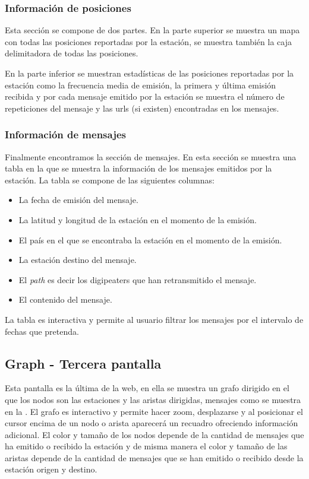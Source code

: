 \subsubsection*{Información de posiciones}
Esta sección se compone de dos partes. En la parte superior se muestra un mapa con todas las posiciones reportadas por la estación, se muestra también la caja delimitadora de todas las posiciones.

En la parte inferior se muestran estadísticas de las posiciones reportadas por la estación como la frecuencia media de emisión, la primera y última emisión recibida y por cada mensaje emitido por la estación se muestra el número de repeticiones del mensaje y las urls (si existen) encontradas en los mensajes.

\subsubsection*{Información de mensajes}
Finalmente encontramos la sección de mensajes. En esta sección se muestra una tabla en la que se muestra la información de los mensajes emitidos por la estación. La tabla se compone de las siguientes columnas:
\begin{itemize}
	\item La fecha de emisión del mensaje.
	\item La latitud y longitud de la estación en el momento de la emisión.
	\item El país en el que se encontraba la estación en el momento de la emisión.
	\item La estación destino del mensaje.
	\item El \textit{path} es decir los digipeaters que han retransmitido el mensaje.
	\item El contenido del mensaje.
\end{itemize}

La tabla es interactiva y permite al usuario filtrar los mensajes por el intervalo de fechas que pretenda.

\subsection*{Graph - Tercera pantalla}
Esta pantalla es la última de la web, en ella se muestra un grafo dirigido en el que los nodos son las estaciones y las aristas dirigidas, mensajes como se muestra en la . El grafo es interactivo y permite hacer zoom, desplazarse y al posicionar el cursor encima de un nodo o arista aparecerá un recuadro ofreciendo información adicional. El color y tamaño de los nodos depende de la cantidad de mensajes que ha emitido o recibido la estación y de misma manera el color y tamaño de las aristas depende de la cantidad de mensajes que se han emitido o recibido desde la estación origen y destino.

